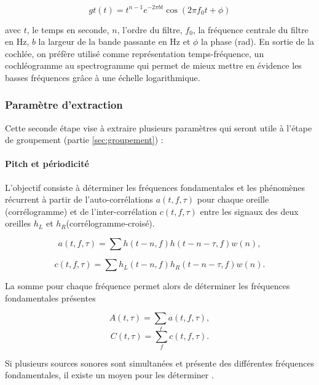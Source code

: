 \begin{equation}
gt(t) = t^{n-1} e^{-2\pi bt } \cos(2\pi f_0 t+\phi)
\end{equation}

avec $t$, le temps en seconde, $n$, l'ordre du filtre, $f_0$, la fréquence centrale du filtre en Hz, $b$ la largeur de la bande passante en Hz et $\phi$ la phase (rad). En sortie de la cochlée, on préfère utilisé comme représentation temps-fréquence, un cochléogramme au spectrogramme qui permet de mieux mettre en évidence les basses fréquences grâce à une échelle logarithmique.\\

\subsubsection{Paramètre d'extraction}

Cette seconde étape vise à extraire plusieurs paramètres qui seront utile à l'étape de groupement (partie \ref{sec:groupement}) : 

\paragraph{Pitch et périodicité}
L'objectif consiste à déterminer les fréquences fondamentales et les phénomènes récurrent à partir de l'auto-corrélations $a(t,f,\tau)$ pour chaque oreille (corrélogramme) et de l'inter-corrélation $c(t,f,\tau)$ entre les signaux des deux oreilles $h_L$ et $h_R$(corrélogramme-croisé). 

\begin{equation}\label{eq:CASA_FAC}
a(t,f,\tau) = \sum h(t-n,f)h(t-n-\tau,f)w(n), 
\end{equation}

\begin{equation}\label{eq:CASA_FAC}
c(t,f,\tau) = \sum h_L(t-n,f)h_R(t-n-\tau,f)w(n).
\end{equation}

La somme pour chaque fréquence permet alors de déterminer les fréquences fondamentales présentes

\begin{equation}
A(t,\tau) = \sum_f a(t,f,\tau),
\end{equation}
\begin{equation}
C(t,\tau) = \sum_f c(t,f,\tau).
\end{equation}

Si plusieurs sources sonores sont simultanées et présente des différentes fréquences fondamentales, il existe un moyen pour les déterminer \cite{DeCheveigne20006}.
